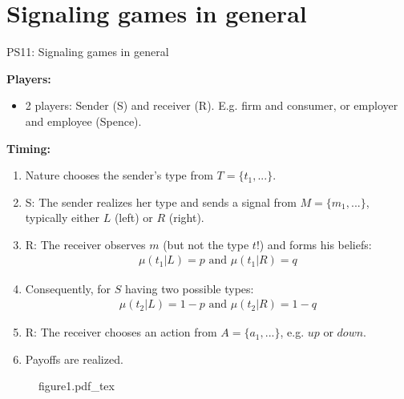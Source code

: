 \section{Signaling games in general}

\begin{frame}{PS11: Signaling games in general}
    \begin{multicols}{2}
      \textbf{Players:}\vspace{-4pt}
      \begin{itemize}
        \item 2 players: Sender (S) and receiver (R). E.g. firm and consumer, or employer and employee (Spence).
      \end{itemize}\vspace{-4pt}
      \textbf{Timing:}\vspace{-4pt}
      \begin{enumerate}
        \item Nature chooses the sender's type from $T=\{t_1,...\}$.
        \item S: The sender realizes her type and sends a signal from $M=\{m_1,...\}$, typically either $L$ (left) or $R$ (right).
        \item R: The receiver observes $m$ (but not the type $t$!) and forms his beliefs:\vspace{-4pt}
        \begin{align*}
          \mu(t_1|L)=p\text{ and }\mu(t_1|R)=q
        \end{align*}
        \item[] \vspace{-4pt} Consequently, for $S$ having two possible types:\vspace{-4pt}
        \begin{align*}
          \mu(t_2|L)=1-p\text{ and }\mu(t_2|R)=1-q
        \end{align*}
        \item \vspace{-4pt} R: The receiver chooses an action from $A=\{a_1,...\}$, e.g. $up$ or $down$.
        \item Payoffs are realized.
      \end{enumerate}
      \vfill\null\columnbreak
      \begin{figure}[!h]
        \center\def\svgwidth{\columnwidth}
        {figure1.pdf_tex}
      \end{figure}
      \vfill\null
    \end{multicols}
\end{frame}

